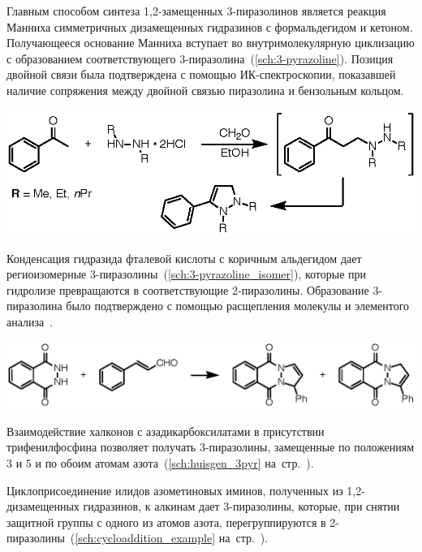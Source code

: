 Главным способом синтеза 1,2-замещенных 3-пиразолинов является реакция Манниха симметричных дизамещенных гидразинов с формальдегидом и кетоном. Получающееся основание Манниха вступает во внутримолекулярную циклизацию с образованием соответствующего 3-пиразолина~(\ref{sch:3-pyrazoline}).
Позиция двойной связи была подтверждена с помощью ИК-спектроскопии, показавшей наличие сопряжения между двойной связью пиразолина и бензольным кольцом.

\begin{scheme}[h!]
    \centering
    \includegraphics{sections/literature/img/3-pyrazoline.eps}
    \caption{}
    \label{sch:3-pyrazoline}
\end{scheme}

Конденсация гидразида фталевой кислоты с коричным альдегидом дает региоизомерные 3-пиразолины~(\ref{sch:3-pyrazoline_isomer}), которые при гидролизе превращаются в соответствующие 2-пиразолины.
Образование 3-пиразолина было подтверждено с помощью расщепления молекулы и элементого анализа~\cite{Chemistry1967}.

\begin{scheme}[h!]
    \centering
    \includegraphics{sections/literature/img/3-pyrazoline_isomer.eps}
    \caption{}
    \label{sch:3-pyrazoline_isomer}
\end{scheme}

Взаимодействие халконов с азадикарбоксилатами в присутствии трифенилфосфина позволяет получать 3-пиразолины, замещенные по положениям 3 и 5 и по обоим атомам азота~(\ref{sch:huisgen_3pyr} на~стр.~\pageref{sch:huisgen_3pyr}).

Циклоприсоединение илидов азометиновых иминов, полученных из 1,2-дизамещенных гидразинов, к алкинам дает 3-пиразолины, которые, при снятии защитной группы с одного из атомов азота, перегруппируются в 2-пиразолины~(\ref{sch:cycloaddition_example} на~стр.~\pageref{sch:cycloaddition_example}).
\FloatBarrier{}

